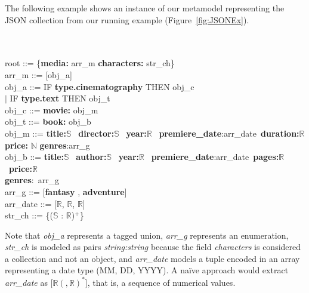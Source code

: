 The following example shows an instance of our metamodel representing the JSON collection from our running example (Figure~\ref{fig:JSONEx}).

\begin{example}
    ~ \\ \\
    root \hspace{20pt} \textnormal{::=} \{\textbf{media:} arr\_m \textbf{characters:} str\_ch\}\\
    arr\_m \hspace{8pt}  \textnormal{::=}  \textnormal{[}obj\_a\textnormal{]} \\
    obj\_a \hspace{10pt} \textnormal{::=} IF \textbf{type.cinematography} THEN obj\_c \\
    \hspace*{52pt} $\mid$ IF \textbf{type.text} THEN obj\_t \\
    obj\_c \hspace{12pt} \textnormal{::=} \textbf{movie:} obj\_m \\
    obj\_t \hspace{14pt} \textnormal{::=} \textbf{book:} obj\_b \\
    obj\_m \hspace{9pt}  \textnormal{::=} \textbf{title:}$\mathbb{S}$ ~\textbf{director:}$\mathbb{S}$ ~\textbf{year:}$\mathbb{R}$ ~\textbf{premiere\_date}:arr\_date~\textbf{duration:}$\mathbb{R}$ \\
    \hspace*{60pt} \textbf{price:} $\mathbb{N}$ \textbf{genres}:arr\_g \\
    obj\_b \hspace{11pt} \textnormal{::=} \textbf{title:}$\mathbb{S}$ ~\textbf{author:}$\mathbb{S}$ ~\textbf{year:}$\mathbb{R}$ ~\textbf{premiere\_date}:arr\_date~\textbf{pages:}$\mathbb{R}$ ~\textbf{price:}$\mathbb{R}$ \\
    \hspace*{60pt} \textbf{genres}:~arr\_g\\
    arr\_g \hspace{11pt} \textnormal{::=} \textnormal{[}\textbf{fantasy} , \textbf{adventure}\textnormal{]} \\
    arr\_date \textnormal{::=} \textnormal{[}$\mathbb{R}$, $\mathbb{R}$, $\mathbb{R}$\textnormal{]} \\
    str\_ch \hspace{9pt} \textnormal{::=} \{\textnormal{(}$\mathbb{S}$ \textnormal{:} $\mathbb{R}$\textnormal{)}$^+$\}%
\end{example}

Note that \textit{obj\_a} represents a tagged union, \textit{arr\_g} represents an enumeration, \textit{str\_ch} is modeled as pairs \textit{string:string} because the field \textit{characters} is considered a collection and not an object, and \textit{arr\_date} models a tuple encoded in an array representing a date type (MM, DD, YYYY). 
A na\"ive approach would extract \textit{arr\_date} as [$\mathbb{R}(,\mathbb{R})^*$], that is, a sequence of numerical values.